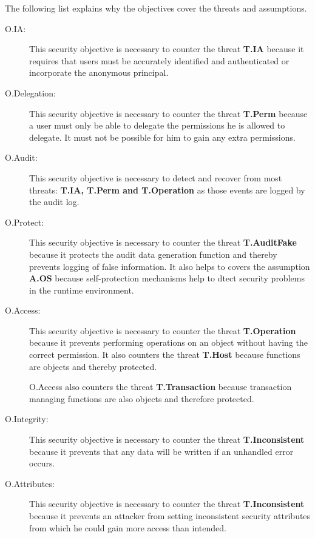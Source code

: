 \documentclass[12pt,english]{scrbook}
\begin{document}
The following list explains why the objectives cover
the threats and assumptions.

\begin{description}
  
  \item[O.IA:] This security objective is necessary to counter the threat
  \textbf{T.IA} because it requires that users must be accurately identified
  and authenticated or incorporate the anonymous principal.

  \item[O.Delegation:] This security objective is necessary to counter the
  threat \textbf{T.Perm} because a user must only be able to delegate the permissions
  he is allowed to delegate. It must not be possible for him to gain any extra
  permissions.
  
  \item[O.Audit:] This security objective is necessary to detect and recover
    from most threats: \textbf{T.IA, T.Perm and T.Operation} as those events
    are logged by the audit log.
  
  \item[O.Protect:] This security objective is necessary to counter the threat
  \textbf{T.AuditFake} because it protects the audit data generation function
  and thereby prevents logging of false information. It also helps to covers
  the assumption \textbf{A.OS} because self-protection mechanisms help to
  dtect security problems in the runtime environment.
  
  \item[O.Access:] This security objective is necessary to counter the threat
  \textbf{T.Operation} because it prevents performing operations on an object
  without having the correct permission. It also counters the threat
  \textbf{T.Host} because functions are objects and thereby protected.

  O.Access also counters the threat \textbf{T.Transaction} because transaction
  managing functions are also objects and therefore protected.

  \item[O.Integrity:] This security objective is necessary to counter the
    threat \textbf{T.Inconsistent} because it prevents that any data will be
    written if an unhandled error occurs.
  
  \item[O.Attributes:] This security objective is necessary to counter the
    threat \textbf{T.Inconsistent} because it prevents an attacker from
    setting inconsistent security attributes from which he could gain more
    access than intended.


\end{description}
\end{document}
